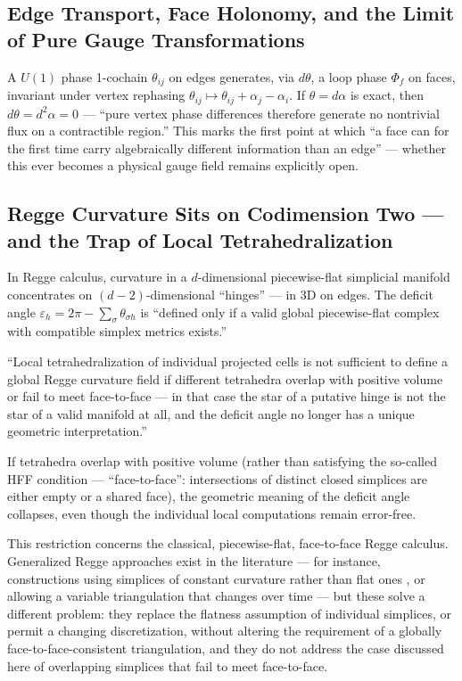\subsection{Edge Transport, Face Holonomy, and the Limit of Pure Gauge Transformations}

A $U(1)$ phase 1-cochain $\theta_{ij}$ on edges generates, via $d\theta$,
a loop phase $\Phi_f$ on faces, invariant under vertex rephasing
$\theta_{ij}\mapsto\theta_{ij}+\alpha_j-\alpha_i$. If $\theta=d\alpha$ is
exact, then $d\theta=d^2\alpha=0$ — ``pure vertex phase differences
therefore generate no nontrivial flux on a contractible region.'' This
marks the first point at which ``a face can for the first time carry
algebraically different information than an edge'' — whether this ever
becomes a physical gauge field remains explicitly open.

\subsection{Regge Curvature Sits on Codimension Two — and the Trap of Local Tetrahedralization}

In Regge calculus, curvature in a $d$-dimensional piecewise-flat
simplicial manifold concentrates on $(d-2)$-dimensional ``hinges'' — in 3D
on edges. The deficit angle $\varepsilon_h=2\pi-\sum_\sigma\theta_{\sigma h}$
is ``defined only if a valid global piecewise-flat complex with compatible
simplex metrics exists.''

\begin{kernbox}[title={The Decisive Precondition}]
``Local tetrahedralization of individual projected cells is not
sufficient to define a global Regge curvature field if different
tetrahedra overlap with positive volume or fail to meet face-to-face — in
that case the star of a putative hinge is not the star of a valid
manifold at all, and the deficit angle no longer has a unique geometric
interpretation.''
\end{kernbox}

If tetrahedra overlap with positive volume (rather than satisfying the
so-called HFF condition — ``face-to-face'': intersections of distinct
closed simplices are either empty or a shared face), the geometric
meaning of the deficit angle collapses, even though the individual local
computations remain error-free.

This restriction concerns the classical, piecewise-flat, face-to-face
Regge calculus. Generalized Regge approaches exist in the literature —
for instance, constructions using simplices of constant curvature rather
than flat ones \cite{BahrDittrich2009}, or allowing a variable
triangulation that changes over time \cite{DittrichHoehn2012} — but these
solve a different problem: they replace the flatness assumption of
individual simplices, or permit a changing discretization, without
altering the requirement of a globally face-to-face-consistent
triangulation, and they do not address the case discussed here of
overlapping simplices that fail to meet face-to-face.

